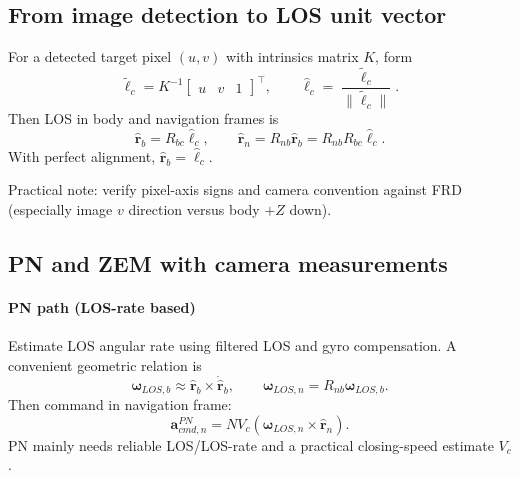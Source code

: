 \documentclass[11pt,a4paper]{article}
\begin{document}
\subsection{From image detection to LOS unit vector}
For a detected target pixel $(u,v)$ with intrinsics matrix $K$, form
\begin{equation}
\tilde{\boldsymbol{\ell}}_c = K^{-1}\begin{bmatrix}u & v & 1\end{bmatrix}^\top,
\qquad
\hat{\boldsymbol{\ell}}_c = \frac{\tilde{\boldsymbol{\ell}}_c}{\|\tilde{\boldsymbol{\ell}}_c\|}.
\end{equation}
Then LOS in body and navigation frames is
\begin{equation}
\hat{\mathbf{r}}_b = R_{bc}\hat{\boldsymbol{\ell}}_c,
\qquad
\hat{\mathbf{r}}_n = R_{nb}\hat{\mathbf{r}}_b = R_{nb}R_{bc}\hat{\boldsymbol{\ell}}_c.
\end{equation}
With perfect alignment, $\hat{\mathbf{r}}_b=\hat{\boldsymbol{\ell}}_c$.

Practical note: verify pixel-axis signs and camera convention against FRD (especially image $v$ direction versus body $+Z$ down).

\subsection{PN and ZEM with camera measurements}
\paragraph{PN path (LOS-rate based)}
Estimate LOS angular rate using filtered LOS and gyro compensation. A convenient geometric relation is
\begin{equation}
\boldsymbol{\omega}_{LOS,b} \approx \hat{\mathbf{r}}_b \times \dot{\hat{\mathbf{r}}}_b,
\qquad
\boldsymbol{\omega}_{LOS,n}=R_{nb}\boldsymbol{\omega}_{LOS,b}.
\end{equation}
Then command in navigation frame:
\begin{equation}
\mathbf{a}_{cmd,n}^{PN} = N V_c\left(\boldsymbol{\omega}_{LOS,n}\times\hat{\mathbf{r}}_n\right).
\end{equation}
PN mainly needs reliable LOS/LOS-rate and a practical closing-speed estimate $V_c$.
\end{document}
